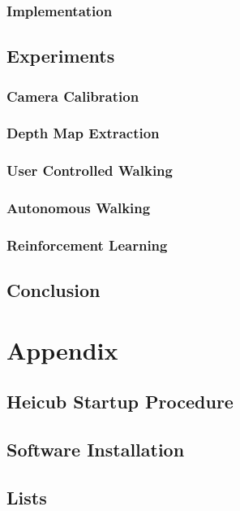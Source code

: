 \documentclass  [
  paper    = a4,
  BCOR     = 10mm,
  twoside,
  fontsize = 12pt,
  toc      = bibnumbered,
  toc      = listofnumbered,
  numbers  = noendperiod,
  headings = normal,
  listof   = leveldown,
  version  = 3.03
]                                       {scrreprt}
\begin{document}
  \section{Implementation}  
   
  \chapter{Experiments}
  
  \section{Camera Calibration}
  \section{Depth Map Extraction}
  \section{User Controlled Walking}
  \section{Autonomous Walking}
  \section{Reinforcement Learning}

  \chapter{Conclusion}

  \part{Appendix}
  \begin{appendix}
    \chapter{Heicub Startup Procedure}
    \chapter{Software Installation}
    \chapter{Lists}
    \listoffigures
    \listoftables
    
    
    
  \end{appendix}
\end{document}
